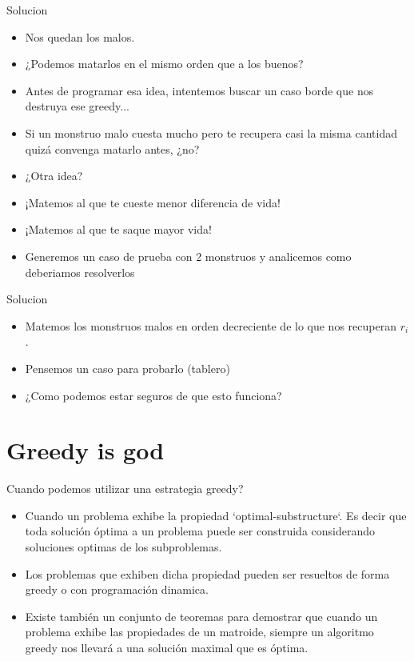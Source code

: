 \documentclass{beamer}
\begin{document}
\begin{frame}{Solucion}
  \begin{itemize}
    \item Nos quedan los malos.
    \item ¿Podemos matarlos en el mismo orden que a los buenos?
    \item Antes de programar esa idea, intentemos buscar un caso borde
      que nos destruya ese greedy...
    \item Si un monstruo malo cuesta mucho pero te recupera casi la
      misma cantidad quizá convenga matarlo antes, ¿no?
    \item ¿Otra idea?
    \item ¡Matemos al que te cueste menor diferencia de vida!
    \item ¡Matemos al que te saque mayor vida!
    \item Generemos un caso de prueba con 2 monstruos y
      analicemos como deberiamos resolverlos
  \end{itemize}
\end{frame}

\begin{frame}{Solucion}
  \begin{itemize}
  \item Matemos los monstruos malos en orden decreciente de lo que
    nos recuperan $r_i$.
  \item Pensemos un caso para probarlo (tablero)
  \item ¿Como podemos estar seguros de que esto funciona?
  \end{itemize}
\end{frame}


\section{Greedy is god}
\begin{frame}{Cuando podemos utilizar una estrategia greedy?}
  \begin{itemize}
  \item Cuando un problema exhibe la propiedad ‘optimal-substructure‘.
    Es decir que toda solución óptima a un problema puede ser
    construida considerando soluciones optimas de los
    subproblemas.
  \item Los problemas que exhiben dicha propiedad pueden ser resueltos
    de forma greedy o con programación dinamica.
  \item Existe también un conjunto de teoremas para demostrar que
    cuando un problema exhibe las propiedades de un matroide,
    siempre un algoritmo greedy nos llevará a una solución maximal
    que es óptima.
  \end{itemize}
\end{frame}
\end{document}
